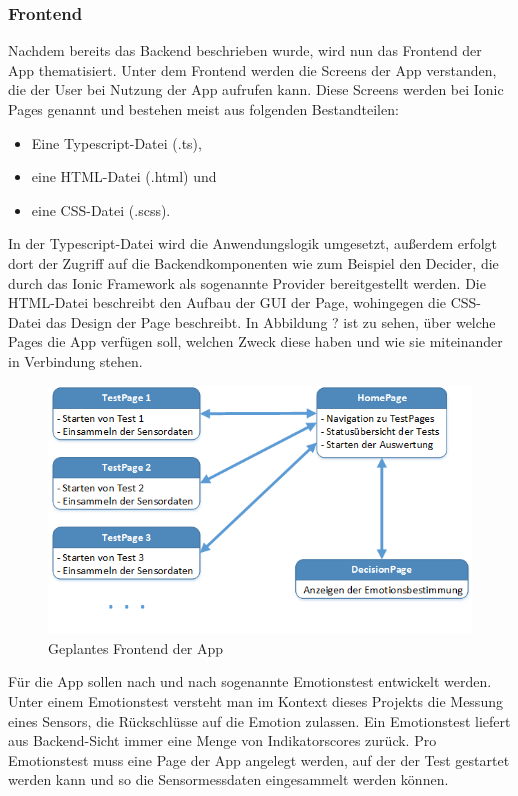 \subsubsection{Frontend}
Nachdem bereits das Backend beschrieben wurde, wird nun das Frontend der App thematisiert. Unter dem Frontend werden die Screens der App verstanden, die der User bei Nutzung der App aufrufen kann. Diese Screens werden bei Ionic Pages genannt und bestehen meist aus folgenden Bestandteilen: 
\begin{itemize}[noitemsep, topsep=0pt]
	\item Eine Typescript-Datei (.ts), 
	\item eine HTML-Datei (.html) und
	\item eine CSS-Datei (.scss).
\end{itemize}
In der Typescript-Datei wird die Anwendungslogik umgesetzt, außerdem erfolgt dort der Zugriff auf die Backendkomponenten wie zum Beispiel den Decider, die durch das Ionic Framework als sogenannte Provider bereitgestellt werden. Die HTML-Datei beschreibt den Aufbau der GUI der Page, wohingegen die CSS-Datei das Design der Page beschreibt. \newline
In Abbildung ? ist zu sehen, über welche Pages die App verfügen soll, welchen Zweck diese haben und wie sie miteinander in Verbindung stehen.
\begin{figure}[h]
	\centering
	\includegraphics[width=15cm]{Bilder/frontend.png}
	\caption[Geplantes Frontend der App]{Geplantes Frontend der App}
\end{figure}%
\newline
Für die App sollen nach und nach sogenannte Emotionstest entwickelt werden. Unter einem Emotionstest versteht man im Kontext dieses Projekts die Messung eines Sensors, die Rückschlüsse auf die Emotion zulassen. Ein Emotionstest liefert aus Backend-Sicht immer eine Menge von Indikatorscores zurück. Pro Emotionstest muss eine Page der App angelegt werden, auf der der Test gestartet werden kann und so die Sensormessdaten eingesammelt werden können. \newline
